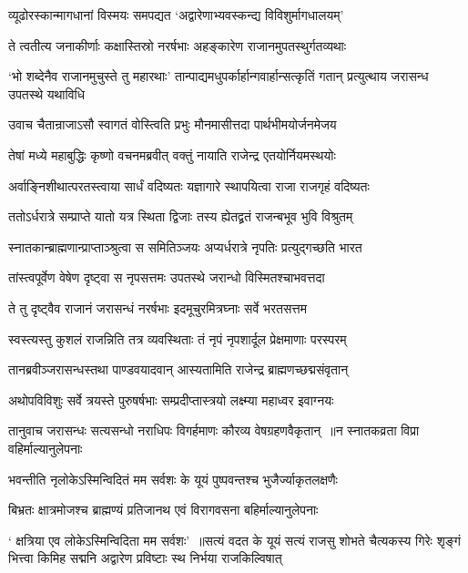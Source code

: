 \twolineshloka
{व्यूढोरस्कान्मागधानां विस्मयः समपद्यत}
{`अद्वारेणाभ्यवस्कन्द्य विविशुर्मागधालयम्'}


\twolineshloka
{ते त्वतीत्य जनाकीर्णाः कक्षास्तिस्रो नरर्षभाः}
{अहङ्कारेण राजानमुपतस्थुर्गतव्यथाः}


\threelineshloka
{`भो शब्देनैव राजानमुचुस्ते तु महारथाः'}
{तान्पाद्यमधुपर्कार्हान्गवार्हान्सत्कृतिं गतान्}
{प्रत्युत्थाय जरासन्ध उपतस्थे यथाविधि}


\twolineshloka
{उवाच चैतान्राजाऽसौ स्वागतं वोस्त्विति प्रभुः}
{मौनमासीत्तदा पार्थभीमयोर्जनमेजय}


\twolineshloka
{तेषां मध्ये महाबुद्धिः कृष्णो वचनमब्रवीत्}
{वक्तुं नायाति राजेन्द्र एतयोर्नियमस्थयोः}


\threelineshloka
{अर्वाङ्निशीथात्परतस्त्वाया सार्धं वदिष्यतः}
{यज्ञागारे स्थापयित्वा राजा राजगृहं वदिष्यतः}
{}


\twolineshloka
{ततोऽर्धरात्रे सम्प्राप्ते यातो यत्र स्थिता द्विजाः}
{तस्य ह्येतद्व्रतं राजन्बभूव भुवि विश्रुतम्}


\twolineshloka
{स्नातकान्ब्राह्मणान्प्राप्ताञ्श्रुत्वा स समितिञ्जयः}
{अप्यर्धरात्रे नृपतिः प्रत्युद्गच्छति भारत}


\twolineshloka
{तांस्त्वपूर्वेण वेषेण दृष्ट्वा स नृपसत्तमः}
{उपतस्थे जरान्धो विस्मितश्चाभवत्तदा}


\twolineshloka
{ते तु दृष्ट्वैव राजानं जरासन्धं नरर्षभाः}
{इदमूचुरमित्रघ्नाः सर्वे भरतसत्तम}


\twolineshloka
{स्वस्त्यस्तु कुशलं राजन्निति तत्र व्यवस्थिताः}
{तं नृपं नृपशार्दूल प्रेक्षमाणाः परस्परम्}


\twolineshloka
{तानब्रवीञ्जरासन्धस्तथा पाण्डवयादवान्}
{आस्यतामिति राजेन्द्र ब्राह्मणच्छद्मसंवृतान्}


\twolineshloka
{अथोपविविशुः सर्वे त्रयस्ते पुरुषर्षभाः}
{सम्प्रदीप्तास्त्रयो लक्ष्म्या महाध्वर इवाग्नयः}


\twolineshloka
{तानुवाच जरासन्धः सत्यसन्धो नराधिपः}
{विगर्हमाणः कौरव्य वेषग्रहणवैकृतान् ॥न स्नातकव्रता विप्रा वहिर्माल्यानुलेपनाः}


\twolineshloka
{भवन्तीति नृलोकेऽस्मिन्विदितं मम सर्वशः}
{के यूयं पुष्पवन्तश्च भुजैर्ज्याकृतलक्षणैः}


\twolineshloka
{बिभ्रतः क्षात्रमोजश्च ब्राह्मण्यं प्रतिजानथ}
{एवं विरागवसना बहिर्माल्यानुलेपनाः}


` क्षत्रिया एव लोकेऽस्मिन्विदिता मम सर्वशः' ॥सत्यं वदत के यूयं सत्यं राजसु शोभते
\twolineshloka
{चैत्यकस्य गिरेः शृङ्गं भित्त्वा किमिह सद्मनि}
{अद्वारेण प्रविष्टाः स्थ निर्भया राजकिल्विषात्}


